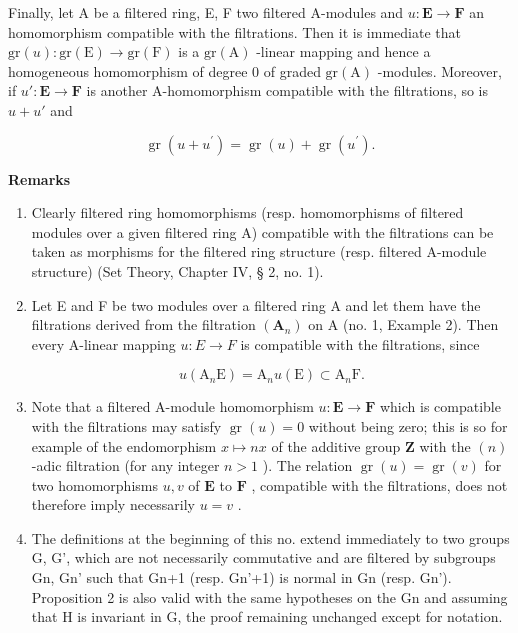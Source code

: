 Finally, let A be a filtered ring, E, F two filtered A-modules and \(u: \mathbf{E} \to \mathbf{F}\) an homomorphism compatible with the filtrations. Then it is immediate that \(\mathrm{gr}(u): \mathrm{gr}(\mathrm{E}) \to \mathrm{gr}(\mathrm{F})\) is a \(\mathrm{gr}(\mathrm{A})\) -linear mapping and hence a homogeneous homomorphism of degree 0 of graded \(\mathrm{gr}(\mathrm{A})\) -modules. Moreover, if \(u': \mathbf{E} \to \mathbf{F}\) is another A-homomorphism compatible with the filtrations, so is \(u + u'\) and

\[
\operatorname{gr} (u + u ^ {\prime}) = \operatorname{gr} (u) + \operatorname{gr} (u ^ {\prime}).\tag{14}
\]

\textbf{Remarks}\par

\begin{enumerate}
\def\labelenumi{(\arabic{enumi})}
\item
  Clearly filtered ring homomorphisms (resp. homomorphisms of filtered modules over a given filtered ring A) compatible with the filtrations can be taken as morphisms for the filtered ring structure (resp. filtered A-module structure) (Set Theory, Chapter IV, § 2, no. 1).
\item
  Let E and F be two modules over a filtered ring A and let them have the filtrations derived from the filtration \((\mathbf{A}_{n})\) on A (no. 1, Example 2). Then every A-linear mapping \(u: E \rightarrow F\) is compatible with the filtrations, since

\[
u (\mathrm{A} _ {n} \mathrm{E}) = \mathrm{A} _ {n} u (\mathrm{E}) \subset \mathrm{A} _ {n} \mathrm{F}.
\]

\item
  Note that a filtered A-module homomorphism \(u: \mathbf{E} \to \mathbf{F}\) which is compatible with the filtrations may satisfy \(\operatorname{gr}(u) = 0\) without being zero; this is so for example of the endomorphism \(x \mapsto nx\) of the additive group \(\mathbf{Z}\) with the \((n)\) -adic filtration (for any integer \(n > 1\) ). The relation \(\operatorname{gr}(u) = \operatorname{gr}(v)\) for two homomorphisms \(u, v\) of \(\mathbf{E}\) to \(\mathbf{F}\) , compatible with the filtrations, does not therefore imply necessarily \(u = v\) .
\item
  The definitions at the beginning of this no. extend immediately to two groups G, G', which are not necessarily commutative and are filtered by subgroups Gn, Gn' such that Gn+1 (resp. Gn'+1) is normal in Gn (resp. Gn'). Proposition 2 is also valid with the same hypotheses on the Gn and assuming that H is invariant in G, the proof remaining unchanged except for notation.
\end{enumerate}

